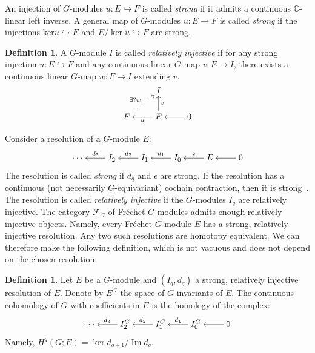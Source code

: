 \documentclass[12pt,reqno]{amsart}
\newcommand{\C}{\mathbb{C}}
\theoremstyle{definition}
\newtheorem{definition}[theorem]{Definition}
\begin{document}
An injection of $G$-modules $u\colon E \hookrightarrow F$ is called \emph{strong} if it admits a continuous $\C$-linear left inverse. A general map of $G$-modules $u\colon E \to F$ is called \emph{strong} if the injections $\mathrm{ker} u \hookrightarrow E$ and $E/ \ker u \hookrightarrow F$ are strong.

\begin{definition}\label{def:rel inj}
    A $G$-module $I$ is called \emph{relatively injective} if for any strong injection $u\colon E \hookrightarrow F$ and any continuous linear $G$-map $v\colon E \to I$, there exists a continuous linear $G$-map $w\colon F \to I$ extending $v$.
\[
\begin{tikzcd}[cramped]
	& I \\
	F & E & 0
	\arrow["{\exists ?w}", dotted, from=2-1, to=1-2]
	\arrow["v"', from=2-2, to=1-2]
	\arrow["u", from=2-2, to=2-1]
	\arrow[from=2-3, to=2-2]
\end{tikzcd}
\]
\end{definition}
Consider a resolution of a $G$-module $E$:
\[
\begin{tikzcd}[cramped]
	{\cdot \cdot \cdot} & {I_2} & {I_1} & {I_0} & E & 0
	\arrow["{d_3}"', from=1-2, to=1-1]
	\arrow["{d_2}"', from=1-3, to=1-2]
	\arrow["{d_1}"', from=1-4, to=1-3]
	\arrow["\epsilon"', from=1-5, to=1-4]
	\arrow[from=1-6, to=1-5]
\end{tikzcd}
\]
The resolution is called \emph{strong} if $d_q$ and $\epsilon$ are strong. If the resolution has a continuous (not necessarily $G$-equivariant) cochain contraction, then it is strong~\cite[2.6~Remarque]{Blanc}. 
The resolution is called \emph{relatively injective} if the $G$-modules $I_q$ are relatively injective. The category $\mathcal{F}_G$ of Fr\'echet $G$-modules admits enough relatively injective objects. Namely, every Fr\'echet $G$-module $E$ has a strong, relatively injective resolution. Any two such resolutions are homotopy equivalent. We can therefore make the following definition, which is not vacuous and does not depend on the chosen resolution.
\begin{definition}
    Let $E$ be a $G$-module and $(I_q,d_q)$ a strong, relatively injective resolution of $E$. Denote by $E^G$ the space of $G$-invariants of $E$. The continuous cohomology of $G$ with coefficients in $E$ is the homology of the complex:
\[\begin{tikzcd}[cramped]
	{\cdot \cdot \cdot} & {I_2^G} & {I_1^G} & {I_0^G} & 0
	\arrow["{d_3}"', from=1-2, to=1-1]
	\arrow["{d_2}"', from=1-3, to=1-2]
	\arrow["{d_1}"', from=1-4, to=1-3]
	\arrow[from=1-5, to=1-4]
\end{tikzcd}\]
Namely, $H^q(G;E) = \ker d_{q+1}/\operatorname{Im} d_q$.
\end{definition}
\end{document}
